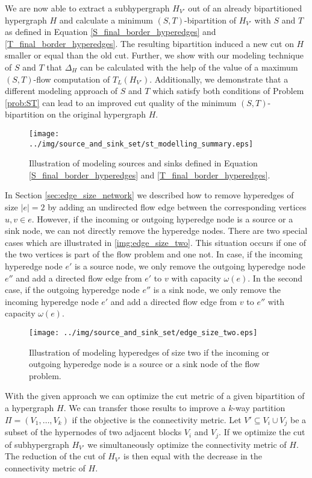 We are now able to extract a subhypergraph $H_{V'}$ out of an already bipartitioned hypergraph $H$ and
calculate a minimum $(S,T)$-bipartition of $H_{V'}$ with $S$ and $T$ as defined
in Equation \ref{S_final_border_hyperedges} and \ref{T_final_border_hyperedges}. The resulting
bipartition induced a new cut on $H$ smaller or equal than the old cut. Further, we show with our
modeling technique of $S$ and $T$ that $\Delta_H$ can be calculated with the help of the value 
of a maximum $(S,T)$-flow computation of $T_L(H_{V'})$. Additionally, we demonstrate that a different
modeling approach of $S$ and $T$ which satisfy both conditions of Problem \ref{prob:ST} can lead to
an improved cut quality of the minimum $(S,T)$-bipartition on the original hypergraph $H$.

\begin{figure}[ht!]
\centering
\texttt{[image: ../img/source\_and\_sink\_set/st\_modelling\_summary.eps]}
\caption{Illustration of modeling sources and sinks defined in Equation \ref{S_final_border_hyperedges}
         and \ref{T_final_border_hyperedges}. }
\label{img:st_modelling_summary}
\end{figure}
In Section \ref{sec:edge_size_network} we described how to remove hyperedges of size $|e| = 2$ 
by adding an undirected flow edge between the corresponding vertices $u,v \in e$. However, if
the incoming or outgoing hyperedge node is a source or a sink node, we can not directly
remove the hyperedge nodes. There are two special cases which are illustrated
in \autoref{img:edge_size_two}. This situation occurs if one of the two vertices is part
of the flow problem and one not. In case, if the incoming hyperedge node $e'$ is a source node, 
we only remove the outgoing hyperedge node $e''$ and add a directed flow edge from $e'$ 
to $v$ with capacity $\omega(e)$. In the second case, if the outgoing hyperedge node $e''$ is
a sink node, we only remove the incoming hyperedge node $e'$ and add a directed flow edge from
$v$ to $e''$ with capacity $\omega(e)$.
\begin{figure}[ht!]
\centering
\texttt{[image: ../img/source\_and\_sink\_set/edge\_size\_two.eps]}
\caption{Illustration of modeling hyperedges of size two if the incoming or outgoing
         hyperedge node is a source or a sink node of the flow problem.}
\label{img:edge_size_two}
\end{figure}

With the given approach we can optimize the cut metric of a given
bipartition of a hypergraph $H$. We can transfer those results to improve
a $k$-way partition $\Pi = (V_1,\ldots,V_k)$ if the objective is the connectivity
metric. Let $V' \subseteq V_i \cup V_j$ be a subset of the hypernodes of two adjacent
blocks $V_i$ and $V_j$. If we optimize the cut of
subhypergraph $H_{V'}$ we simultaneously optimize the connectivity metric of $H$.
The reduction of the cut of $H_{V'}$ is then equal with the decrease in
the connectivity metric of $H$.


